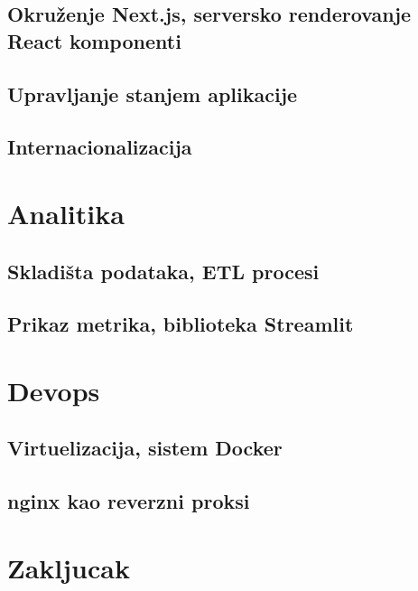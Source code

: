 \documentclass[12pt,oneside]{memoir}
\begin{document}
\section{Okruženje Next.js, serversko renderovanje React komponenti}
\section{Upravljanje stanjem aplikacije}
\section{Internacionalizacija}


\chapter{Analitika}
\section{Skladišta podataka, ETL procesi}
\section{Prikaz metrika, biblioteka Streamlit}

\chapter{Devops}
\section{Virtuelizacija, sistem Docker}
\section{nginx kao reverzni proksi}

\chapter{Zakljucak}
\literatura
\end{document}
